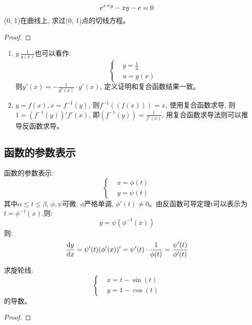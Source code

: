 \begin{example}
    \[ \mathrm{e}^{x+y} - xy - e = 0\]
    (0, 1)在曲线上, 求过(0, 1)点的切线方程。
\end{example}
\begin{proof}
    
\end{proof}

\begin{remark}
    \begin{enumerate}
        \item $y \ \frac{1}{g(x)}$也可以看作:
        \begin{equation*}
            \left\{ 
                \begin{aligned}
                    &y = \frac{1}{u} \\
                    &u = g(x)
                \end{aligned}
            \right.
        \end{equation*}
        则$y'(x) = -\frac{1}{g^2(x)}\cdot g'(x)$, 定义证明和复合函数结果一致。
        \item $y = f(x), x = f^{-1}(y)$, 则$f^{-1}((f(x))) = x$, 使用复合函数求导, 则$1 = (f^{-1}(y))'f'(x)$, 即$(f^{-1}(y)) = \frac{1}{f'(x)}$, 用复合函数求导法则可以推导反函数求导。
    \end{enumerate}
\end{remark}

\subsection{函数的参数表示}
函数的参数表示:
\begin{equation*}
    \left\{ 
        \begin{aligned}
            &x = \phi(t) \\
            &y = \psi(t)
        \end{aligned}
    \right.
\end{equation*}
其中$\alpha \le t \le \beta$, $\phi, \psi$可微, $\phi$严格单调, $\phi '(t) \neq 0$。由反函数可导定理t可以表示为$t = \phi^{-1}(x)$,则:
\begin{equation*}
    y = \psi(\phi^{-1}(x))
\end{equation*}
则:
\begin{equation*}
    \frac{\mathrm{d} y}{\mathrm{d} x} = \psi'(t)(\phi'(x))' = \psi'(t)\cdot \frac{1}{\phi(t)} = \frac{\psi'(t)}{\phi'(t)}
\end{equation*}

\begin{example}
    求旋轮线:
    \begin{equation*}
        \left\{ 
            \begin{aligned}
                &x = t - \sin(t) \\
                &y = 1 - \cos(t)
            \end{aligned}
        \right.
    \end{equation*}
    的导数。
\end{example}
\begin{proof}
    
\end{proof}

